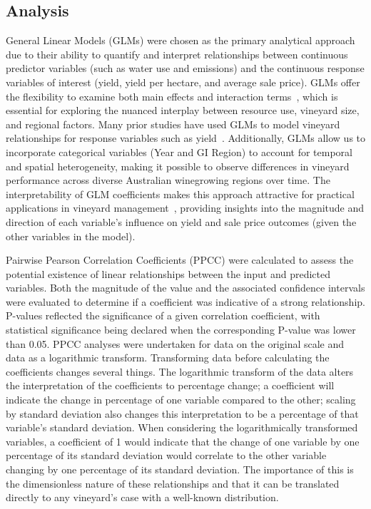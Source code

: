 \documentclass[10pt,letterpaper]{article}
\begin{document}
\subsection*{Analysis}
General Linear Models (GLMs) were chosen as the primary analytical approach due to their ability to quantify and interpret relationships between continuous predictor variables (such as water use and emissions) and the continuous response variables of interest (yield, yield per hectare, and average sale price). GLMs offer the flexibility to examine both main effects and interaction terms~\cite{fahrmeir2013regression}, which is essential for exploring the nuanced interplay between resource use, vineyard size, and regional factors. Many prior studies have used GLMs to model vineyard relationships for response variables such as yield~\cite{SalinasRuiz2023, Baptiste2021}. Additionally, GLMs allow us to incorporate categorical variables (Year and GI Region) to account for temporal and spatial heterogeneity, making it possible to observe differences in vineyard performance across diverse Australian winegrowing regions over time. The interpretability of GLM coefficients makes this approach attractive for practical applications in vineyard management~\cite{kutner2005applied}, providing insights into the magnitude and direction of each variable's influence on yield and sale price outcomes (given the other variables in the model).
\par
Pairwise Pearson Correlation Coefficients (PPCC) were calculated to assess the potential existence of linear relationships between the input and predicted variables. Both the magnitude of the value and the associated confidence intervals were evaluated to determine if a coefficient was indicative of a strong relationship. P-values reflected the significance of a given correlation coefficient, with statistical significance being declared when the corresponding P-value was lower than 0.05. PPCC analyses were undertaken for data on the original scale and data as a logarithmic transform. Transforming data before calculating the coefficients changes several things. The logarithmic transform of the data alters the interpretation of the coefficients to percentage change; a coefficient will indicate the change in percentage of one variable compared to the other; scaling by standard deviation also changes this interpretation to be a percentage of that variable's standard deviation. When considering the logarithmically transformed variables, a coefficient of 1 would indicate that the change of one variable by one percentage of its standard deviation would correlate to the other variable changing by one percentage of its standard deviation. The importance of this is the dimensionless nature of these relationships and that it can be translated directly to any vineyard's case with a well-known distribution.
\end{document}
